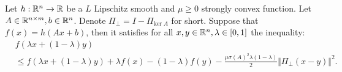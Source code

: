 \documentclass[12pt]{article}
\begin{document}
    \begin{theorem}\;\label{thm:jen-ineq}
        Let $h: \mathbb R^n \rightarrow \mathbb R$ be a $L$ Lipschitz smooth and $\mu\ge 0$ strongly convex function.  
        Let $A \in \mathbb R^{n\times m}, b \in \mathbb R^n$. 
        Denote $\Pi_{\perp} = I - \Pi_{\text{ker}\; A}$ for short. 
        Suppose that $f(x) = h(Ax + b)$, then it satisfies for all $x, y \in \mathbb R^n, \lambda\in [0, 1]$ the inequality: 
        \begin{align*}
            &f(\lambda x + (1 - \lambda)y) 
            \\
            &\le 
            f(\lambda x + (1 - \lambda)y) + \lambda f(x) - (1 - \lambda)f(y)
            - \frac{\mu\sigma(A)^2\lambda(1 - \lambda)}{2}\Vert \Pi_{\perp}(x - y)\Vert^2. 
        \end{align*}
    \end{theorem}
\end{document}
